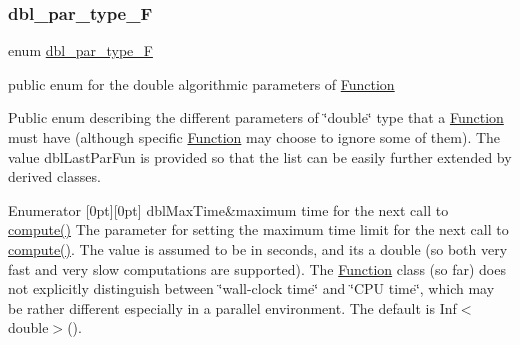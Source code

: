 \subsubsection{\texorpdfstring{dbl\+\_\+par\+\_\+type\+\_\+F}{dbl\_par\_type\_F}}
{\footnotesize\ttfamily enum \mbox{\hyperlink{class_s_m_spp__di__unipi__it_1_1_function_ad7177cbeb2113eb7a975acec14d13027}{dbl\+\_\+par\+\_\+type\+\_\+F}}}



public enum for the double algorithmic parameters of \mbox{\hyperlink{class_s_m_spp__di__unipi__it_1_1_function}{Function}} 

Public enum describing the different parameters of \char`\"{}double\char`\"{} type that a \mbox{\hyperlink{class_s_m_spp__di__unipi__it_1_1_function}{Function}} must have (although specific \mbox{\hyperlink{class_s_m_spp__di__unipi__it_1_1_function}{Function}} may choose to ignore some of them). The value dbl\+Last\+Par\+Fun is provided so that the list can be easily further extended by derived classes. \begin{DoxyEnumFields}{Enumerator}
[0pt][0pt]{}\mbox{\label{class_s_m_spp__di__unipi__it_1_1_function_ad7177cbeb2113eb7a975acec14d13027acd77e71bf86e7d641a5e571a18efae5a}} 
dbl\+Max\+Time&maximum time for the next call to \mbox{\hyperlink{class_s_m_spp__di__unipi__it_1_1_function_a504d4e3e174c7a518cc66156a8a45ce5}{compute()}} The parameter for setting the maximum time limit for the next call to \mbox{\hyperlink{class_s_m_spp__di__unipi__it_1_1_function_a504d4e3e174c7a518cc66156a8a45ce5}{compute()}}. The value is assumed to be in seconds, and it\textquotesingle{}s a double (so both very fast and very slow computations are supported). The \mbox{\hyperlink{class_s_m_spp__di__unipi__it_1_1_function}{Function}} class (so far) does not explicitly distinguish between \char`\"{}wall-\/clock time\char`\"{} and \char`\"{}\+C\+P\+U time\char`\"{}, which may be rather different especially in a parallel environment. The default is Inf$<$double$>$(). \\
\hline


\end{DoxyEnumFields}
